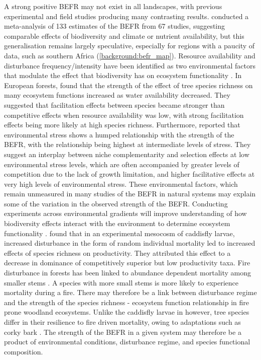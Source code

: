 \begin{refsection}
A strong positive BEFR may not exist in all landscapes, with previous experimental and field studies producing many contrasting results. \citet{Duffy2017} conducted a meta-analysis of 133 estimates of the BEFR from 67 studies, suggesting comparable effects of biodiversity and climate or nutrient availability, but this generalisation remains largely speculative, especially for regions with a paucity of data, such as southern Africa (\autoref{background:befr_map}). Resource availability and disturbance frequency/intensity have been identified as two environmental factors that modulate the effect that biodiversity has on ecosystem functionality \citep{Tilman2012a, Tilman2014, Hooper2012}. In European forests, \citet{Ratcliffe2017} found that the strength of the effect of tree species richness on many ecosystem functions increased as water availability decreased. They suggested that facilitation effects between species became stronger than competitive effects when resource availability was low, with strong facilitation effects being more likely at high species richness. Furthermore, \citet{Baert2018} reported that environmental stress shows a humped relationship with the strength of the BEFR, with the relationship being highest at intermediate levels of stress. They suggest an interplay between niche complementarity and selection effects at low environmental stress levels, which are often accompanied by greater levels of competition due to the lack of growth limitation, and higher facilitative effects at very high levels of environmental stress. These environmental factors, which remain unmeasured in many studies of the BEFR in natural systems may explain some of the variation in the observed strength of the BEFR. Conducting experiments across environmental gradients will improve understanding of how biodiversity effects interact with the environment to determine ecosystem functionality \citep{Turnbull2016, Tilman2014}. \citet{Cardinale2002} found that in an experimental mesocosm of caddisfly larvae, increased disturbance in the form of random individual mortality led to increased effects of species richness on productivity. They attributed this effect to a decrease in dominance of competitively superior but low productivity taxa. Fire disturbance in forests has been linked to abundance dependent mortality among smaller stems \citep{Roques2001}. A species with more small stems is more likely to experience mortality during a fire. There may therefore be a link between disturbance regime and the strength of the species richness - ecosystem function relationship in fire prone woodland ecosystems. Unlike the caddisfly larvae in \citet{Cardinale2002} however, tree species differ in their resilience to fire driven mortality, owing to adaptations such as corky bark \citep{Solbrig1996}. The strength of the BEFR in a given system may therefore be a product of environmental conditions, disturbance regime, and species functional composition.


\end{refsection}

